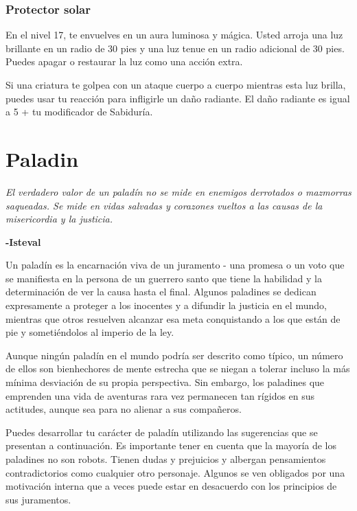 \documentclass[a4paper,twocolumn,openany,10pt]{dndbook}
\begin{document}
\subsubsection{Protector solar}
En el nivel 17, te envuelves en un aura luminosa y mágica. Usted arroja una luz brillante en un radio de 30 pies y una luz tenue
en un radio adicional de 30 pies. Puedes apagar o restaurar la luz como una acción extra.

Si una criatura te golpea con un ataque cuerpo a cuerpo mientras esta luz brilla, puedes usar tu reacción para infligirle un
daño radiante. El daño radiante es igual a 5 + tu modificador de Sabiduría. 

\section{Paladin}
\begin{quotebox}
	\textit{El verdadero valor de un paladín no se mide en enemigos derrotados o mazmorras saqueadas. Se mide en vidas salvadas
	y corazones vueltos a las causas de la misericordia y la justicia.}

	\begin{flushright}
	\textbf{-Isteval}
	\end{flushright}
\end{quotebox}

Un paladín es la encarnación viva de un juramento - una promesa o un voto que se manifiesta en la persona de un guerrero santo
que tiene la habilidad y la determinación de ver la causa hasta el final. Algunos paladines se dedican expresamente a proteger
a los inocentes y a difundir la justicia en el mundo, mientras que otros resuelven alcanzar esa meta conquistando a los que
están de pie y sometiéndolos al imperio de la ley.

Aunque ningún paladín en el mundo podría ser descrito como típico, un número de ellos son bienhechores de mente estrecha que se
niegan a tolerar incluso la más mínima desviación de su propia perspectiva. Sin embargo, los paladines que emprenden una vida de
aventuras rara vez permanecen tan rígidos en sus actitudes, aunque sea para no alienar a sus compañeros.

Puedes desarrollar tu carácter de paladín utilizando las sugerencias que se presentan a continuación. Es importante tener en
cuenta que la mayoría de los paladines no son robots. Tienen dudas y prejuicios y albergan pensamientos contradictorios como
cualquier otro personaje. Algunos se ven obligados por una motivación interna que a veces puede estar en desacuerdo con los
principios de sus juramentos.
\end{document}
